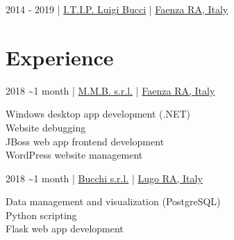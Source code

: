 \documentclass{article}
\begin{document}
\begin{paracol}{2}
\begin{tcolorbox}[title=\emoji{closed-book} High School Diploma in Information Technology,colback=white,arc=0pt]
     2014 - 2019 \hfill | \hfill
    \href{https://www.itipfaenza.edu.it/}{ I.T.I.P. Luigi Bucci} \hfill | \hfill
    \href{https://www.openstreetmap.org/relation/2227656}{ Faenza RA, Italy}
\end{tcolorbox}

%
%

\vfill

\section*{ Experience}

\begin{tcolorbox}[title=\emoji{man-technologist} Software Developer Internship,colback=white,arc=0pt]
     2018 \textasciitilde 1 month \hfill | \hfill
    \href{https://www.mmbsoftware.it/portalemmb/en/home}{ M.M.B. s.r.l.} \hfill | \hfill
    \href{https://www.openstreetmap.org/node/1864397767}{ Faenza RA, Italy}

    \tcblower

     Windows desktop app development (.NET) \\[4pt]
     Website debugging \\[4pt]
     JBoss web app frontend development \\[4pt]
     WordPress website management
\end{tcolorbox}

\begin{tcolorbox}[title=\emoji{man-technologist} Software Developer Internship,colback=white,arc=0pt]
     2018 \textasciitilde 1 month \hfill | \hfill
    \href{http://www.bucchi.it/en/}{ Bucchi s.r.l.} \hfill | \hfill
    \href{https://www.openstreetmap.org/node/4752486846}{ Lugo RA, Italy}

    \tcblower

     Data management and visualization (PostgreSQL) \\[4pt]
     Python scripting \\[4pt]
     Flask web app development
\end{tcolorbox}


\end{paracol}
\end{document}
